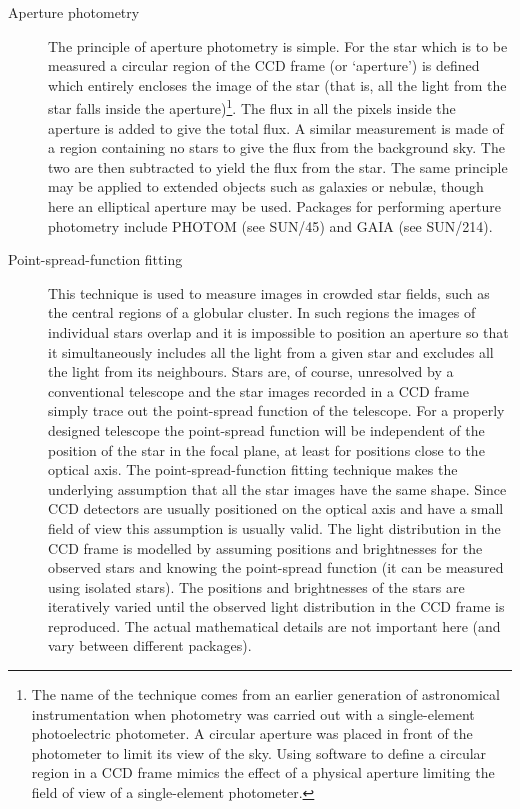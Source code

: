 \documentclass[twoside,11pt]{article}
\newcommand{\xref}[3]{#1}
\begin{document}
\begin{description}

  \item[Aperture photometry] The principle of aperture photometry is
   simple.  For the star which is to be measured a circular region
   of the CCD frame (or `aperture') is defined which entirely encloses
   the image of the star (that is, all the light from the star falls
   inside the aperture)\footnote{The name of the technique comes from
   an earlier generation of astronomical instrumentation when photometry
   was carried out with a single-element photoelectric photometer.  A
   circular aperture was placed in front of the photometer to limit
   its view of the sky.  Using software to define a circular region
   in a CCD frame mimics the effect of a physical aperture limiting
   the field of view of a single-element photometer.}.  The flux in all
   the pixels inside the aperture is added to give the total flux.  A
   similar measurement is made of a region containing no stars to give
   the flux from the background sky.  The two are then subtracted to yield
   the flux from the star.  The same principle may be applied to extended
   objects such as galaxies or nebul\ae, though here an elliptical aperture
   may be used.  Packages for performing aperture photometry include
   PHOTOM (see \xref{SUN/45}{sun45}{}\cite{SUN45}) and GAIA (see
   \xref{SUN/214}{sun214}{}\cite{SUN214}).

  \item[Point-spread-function fitting] This technique is used to
   measure images in crowded star fields, such as the central regions
   of a globular cluster.  In such regions the images of individual
   stars overlap and it is impossible to position an aperture so that
   it simultaneously includes all the light from a given star and
   excludes all the light from its neighbours.  Stars are, of course,
   unresolved by a conventional telescope and the star images recorded
   in a CCD frame simply trace out the point-spread function of the
   telescope.  For a properly designed telescope the point-spread
   function will be independent of the position of the star in the
   focal plane, at least for positions close to the optical axis.
   The point-spread-function fitting technique makes the underlying
   assumption that all the star images have the same shape.  Since CCD
   detectors are usually positioned on the optical axis and have a small
   field of view this assumption is usually valid.  The light distribution
   in the CCD frame is modelled by assuming positions and brightnesses
   for the observed stars and knowing the point-spread function (it can
   be measured using isolated stars).  The positions and brightnesses of
   the stars are iteratively varied until the observed light distribution
   in the CCD frame is reproduced.  The actual mathematical details are
   not important here (and vary between different packages).


\end{description}
\end{document}
